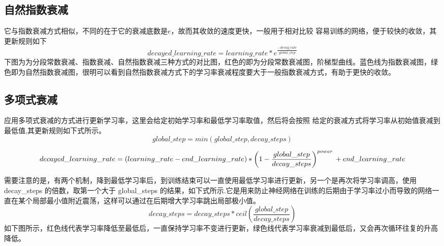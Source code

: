 
\subsection{自然指数衰减}\label{ux81eaux7136ux6307ux6570ux8870ux51cf}

​
它与指数衰减方式相似，不同的在于它的衰减底数是\(e\)，故而其收敛的速度更快，一般用于相对比较
容易训练的网络，便于较快的收敛，其更新规则如下 \[
decayed{\_}learning{\_}rate =learning{\_}rate*e^{\frac{-decay{\_rate}}{global{\_}step}}
\] ​
下图为为分段常数衰减、指数衰减、自然指数衰减三种方式的对比图，红色的即为分段常数衰减图，阶梯型曲线。蓝色线为指数衰减图，绿色即为自然指数衰减图，很明可以看到自然指数衰减方式下的学习率衰减程度要大于一般指数衰减方式，有助于更快的收敛。

 

\subsection{ 多项式衰减}\label{ux591aux9879ux5f0fux8870ux51cf}

​
应用多项式衰减的方式进行更新学习率，这里会给定初始学习率和最低学习率取值，然后将会按照
给定的衰减方式将学习率从初始值衰减到最低值,其更新规则如下式所示。 \[
global{\_}step=min(global{\_}step,decay{\_}steps)
\]

\[
decayed{\_}learning{\_}rate =(learning{\_}rate-end{\_}learning{\_}rate)* \left( 1-\frac{global{\_step}}{decay{\_}steps}\right)^{power} \\
 +end{\_}learning{\_}rate
\]

​
需要注意的是，有两个机制，降到最低学习率后，到训练结束可以一直使用最低学习率进行更新，另一个是再次将学习率调高，使用
decay\_steps 的倍数，取第一个大于 global\_steps
的结果，如下式所示.它是用来防止神经网络在训练的后期由于学习率过小而导致的网络一直在某个局部最小值附近震荡，这样可以通过在后期增大学习率跳出局部极小值。
\[
decay{\_}steps = decay{\_}steps*ceil \left( \frac{global{\_}step}{decay{\_}steps}\right)
\] ​
如下图所示，红色线代表学习率降低至最低后，一直保持学习率不变进行更新，绿色线代表学习率衰减到最低后，又会再次循环往复的升高降低。

 
